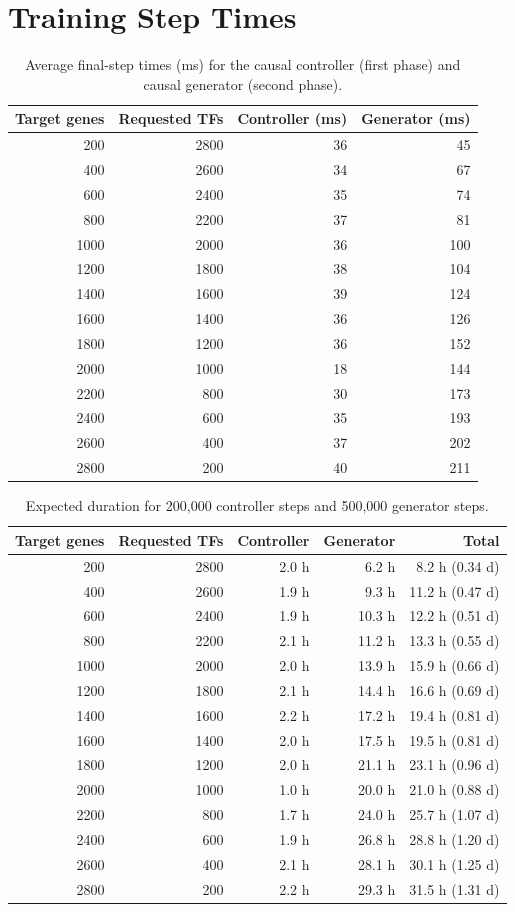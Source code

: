 \documentclass[11pt]{article}
\begin{document}
\section{Training Step Times}
\begin{table}[H]\centering
\caption{Average final-step times (ms) for the causal controller (first phase) and causal generator (second phase).}
\label{tab:step}
\begin{tabular}{rrrr}\toprule Target genes & Requested TFs & Controller (ms) & Generator (ms) \\ \midrule
200 & 2800 & 36 & 45 \\
400 & 2600 & 34 & 67 \\
600 & 2400 & 35 & 74 \\
800 & 2200 & 37 & 81 \\
1000 & 2000 & 36 & 100 \\
1200 & 1800 & 38 & 104 \\
1400 & 1600 & 39 & 124 \\
1600 & 1400 & 36 & 126 \\
1800 & 1200 & 36 & 152 \\
2000 & 1000 & 18 & 144 \\
2200 & 800 & 30 & 173 \\
2400 & 600 & 35 & 193 \\
2600 & 400 & 37 & 202 \\
2800 & 200 & 40 & 211 \\
\bottomrule\end{tabular}\end{table}
\begin{table}[H]\centering
\caption{Expected duration for 200,000 controller steps and 500,000 generator steps.}
\label{tab:duration}
\begin{tabular}{rrrrr}\toprule Target genes & Requested TFs & Controller & Generator & Total \\ \midrule
200 & 2800 & 2.0 h & 6.2 h & 8.2 h (0.34 d) \\
400 & 2600 & 1.9 h & 9.3 h & 11.2 h (0.47 d) \\
600 & 2400 & 1.9 h & 10.3 h & 12.2 h (0.51 d) \\
800 & 2200 & 2.1 h & 11.2 h & 13.3 h (0.55 d) \\
1000 & 2000 & 2.0 h & 13.9 h & 15.9 h (0.66 d) \\
1200 & 1800 & 2.1 h & 14.4 h & 16.6 h (0.69 d) \\
1400 & 1600 & 2.2 h & 17.2 h & 19.4 h (0.81 d) \\
1600 & 1400 & 2.0 h & 17.5 h & 19.5 h (0.81 d) \\
1800 & 1200 & 2.0 h & 21.1 h & 23.1 h (0.96 d) \\
2000 & 1000 & 1.0 h & 20.0 h & 21.0 h (0.88 d) \\
2200 & 800 & 1.7 h & 24.0 h & 25.7 h (1.07 d) \\
2400 & 600 & 1.9 h & 26.8 h & 28.8 h (1.20 d) \\
2600 & 400 & 2.1 h & 28.1 h & 30.1 h (1.25 d) \\
2800 & 200 & 2.2 h & 29.3 h & 31.5 h (1.31 d) \\
\bottomrule\end{tabular}\end{table}
\end{document}
